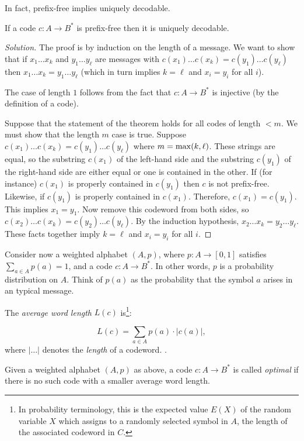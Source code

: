 In fact, prefix-free implies uniquely decodable.

\begin{theorem}
{\rm
If a code $c:A\to B^*$ is prefix-free then it is uniquely decodable.
}
\end{theorem}

\begin{proof}[Solution]
The proof is by induction on the length of a message.
We want to show that if $x_1\dots x_k$ and $y_1\dots y_\ell$ are
messages with $c(x_1)\dots c(x_k)=c(y_1)\dots c(y_\ell)$
then  $x_1\dots x_k=y_1\dots y_\ell$ (which in turn implies
$k=\ell$ and $x_i=y_i$ for all $i$).

The case of length $1$ follows from the fact that
$c:A\to B^*$ is injective (by the definition of a code).

Suppose that the statement of the theorem holds for all
codes of length $<m$. We must show that the length $m$
case is true.
Suppose $c(x_1)\dots c(x_k)=c(y_1)\dots c(y_\ell)$ where
$m={\rm max}(k,\ell)$. These strings are equal, so the
substring $c(x_1)$ of the left-hand side and the substring $c(y_1)$
of the right-hand side are either equal or one is contained in the other.
If (for instance) $c(x_1)$ is properly contained in $c(y_1)$ then
$c$ is not prefix-free. Likewise, if $c(y_1)$ is properly contained in
$c(x_1)$. Therefore, $c(x_1)=c(y_1)$. This implies $x_1=y_1$.
Now remove this
codeword from both sides, so $c(x_2)\dots c(x_k)=c(y_2)\dots c(y_\ell)$.
By the induction hypothesis, $x_2\dots x_k=y_2\dots y_\ell$.
These facts together imply $k=\ell$ and $x_i=y_i$ for all $i$.
\end{proof}


Consider now a weighted alphabet $(A,p)$, where
$p:A\to [0,1]$ satisfies $\sum_{a\in A}p(a)=1$,
and a code $c:A\to B^*$.
In other words, $p$ is a probability distribution on $A$.
Think of $p(a)$ as the probability that the symbol $a$
arises in an typical message.

The {\it average word length} $L(c)$ is\footnote{In probability terminology,
this is the expected value $E(X)$ of the
random variable $X$ which assigns to a randomly selected
symbol in $A$, the length of the associated codeword in $C$.}:

\[
L(c) = \sum_{a\in A} p(a)\cdot |c(a)|,
\]
where $|\dots |$ denotes the {\it length} of a codeword.
.

Given a weighted alphabet $(A,p)$ as above,
a code $c:A\to B^*$ is called {\it optimal} if there
is no such code with a smaller average word length.


